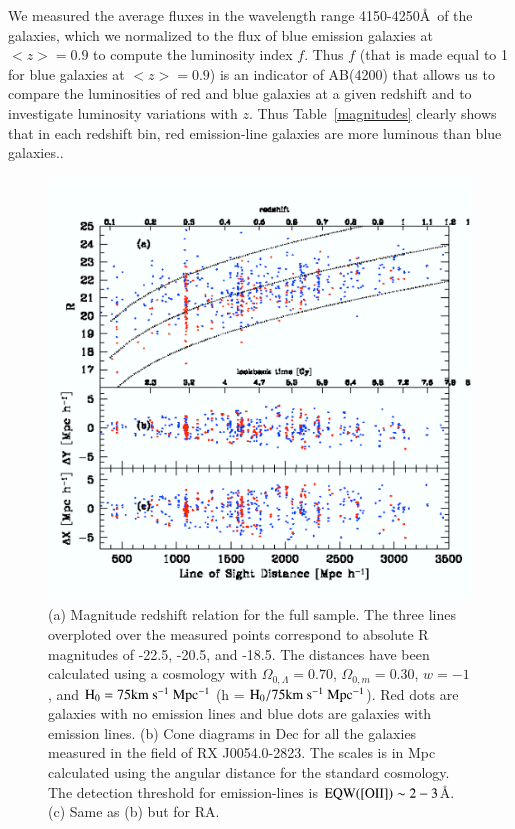 \documentclass[referee]{aa}
\begin{document}
We measured the average fluxes in the wavelength range  
4150-4250\AA\ of the galaxies, which we normalized to the flux of blue emission galaxies at $<z> = 0.9$ to compute the luminosity index $f$. 
Thus $f$ (that is made equal to 1 for blue 
galaxies at $<z> = 0.9$) is an indicator of AB(4200) that allows us to compare the luminosities of 
red and blue galaxies at a given redshift and to investigate luminosity variations with $z$. Thus Table~\ref{magnitudes} clearly shows that in each redshift bin, red emission-line galaxies are more luminous than
blue galaxies..


\begin{figure}
\vspace*{-0.0cm}
\includegraphics[width=15cm]{figures/egmnFig6.eps}
     \vspace*{-0.0cm}
    \caption{ (a) Magnitude redshift relation for the full sample. The three lines overploted over
the measured points correspond to absolute R magnitudes of -22.5, -20.5, and -18.5.
The distances have been calculated using a cosmology with $\Omega_{0,\Lambda}=0.70$, 
$\Omega_{0,m}=0.30$, $w=-1$, and $\rm H_0 = 75 km~s^{-1}~Mpc^{-1}$ (h = $\rm H_0/75 km~s^{-1}~Mpc^{-1}$). 
Red dots are galaxies with no emission lines and blue dots are galaxies with emission lines.
(b) Cone diagrams in Dec for all the galaxies measured in the field of RX J0054.0-2823. 
The scales is in Mpc calculated using the angular distance for the standard cosmology.
The detection threshold for emission-lines is $\rm EQW([OII])\sim 2-3$\AA. 
(c) Same as (b) but for RA.
}
\label{PieDia}
\end{figure}
\end{document}

